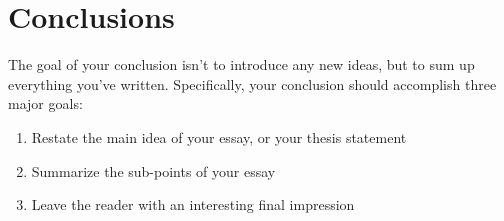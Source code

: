 \chapter{Conclusions}
The goal of your conclusion isn’t to introduce any new ideas, but to sum up everything you’ve written. Specifically, your conclusion should accomplish three major goals:

\begin{enumerate}
    \item Restate the main idea of your essay, or your thesis statement
    \item Summarize the sub-points of your essay
    \item Leave the reader with an interesting final impression
\end{enumerate}